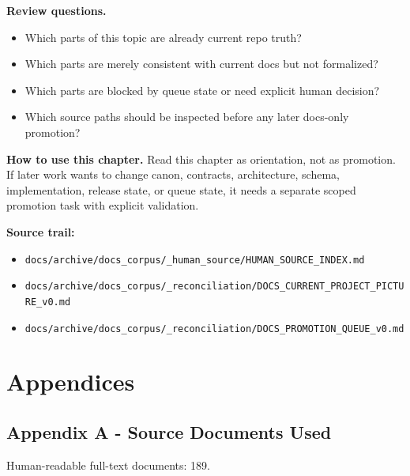 \documentclass[10.5pt,a4paper,openany]{book}
\begin{document}
\textbf{Review questions.}


\begin{itemize}
\item Which parts of this topic are already current repo truth?
\item Which parts are merely consistent with current docs but not formalized?
\item Which parts are blocked by queue state or need explicit human decision?
\item Which source paths should be inspected before any later docs-\allowbreak{}only promotion?
\end{itemize}

\textbf{How to use this chapter.} Read this chapter as orientation, not as promotion.\allowbreak{} If later work wants to change canon, contracts, architecture, schema, implementation, release state, or queue state, it needs a separate scoped promotion task with explicit validation.\allowbreak{}


\textbf{Source trail:}


\begin{itemize}
\item \texttt{docs/\allowbreak{}archive/\allowbreak{}docs\_\allowbreak{}corpus/\allowbreak{}\_\allowbreak{}human\_\allowbreak{}source/\allowbreak{}HUMAN\_\allowbreak{}SOURCE\_\allowbreak{}INDEX.\allowbreak{}md}
\item \texttt{docs/\allowbreak{}archive/\allowbreak{}docs\_\allowbreak{}corpus/\allowbreak{}\_\allowbreak{}reconciliation/\allowbreak{}DOCS\_\allowbreak{}CURRENT\_\allowbreak{}PROJECT\_\allowbreak{}PICTURE\_\allowbreak{}v0.\allowbreak{}md}
\item \texttt{docs/\allowbreak{}archive/\allowbreak{}docs\_\allowbreak{}corpus/\allowbreak{}\_\allowbreak{}reconciliation/\allowbreak{}DOCS\_\allowbreak{}PROMOTION\_\allowbreak{}QUEUE\_\allowbreak{}v0.\allowbreak{}md}
\end{itemize}


\chapter{Appendices}

\section{Appendix A - Source Documents Used}

Human-\allowbreak{}readable full-\allowbreak{}text documents: 189.\allowbreak{}
\end{document}
